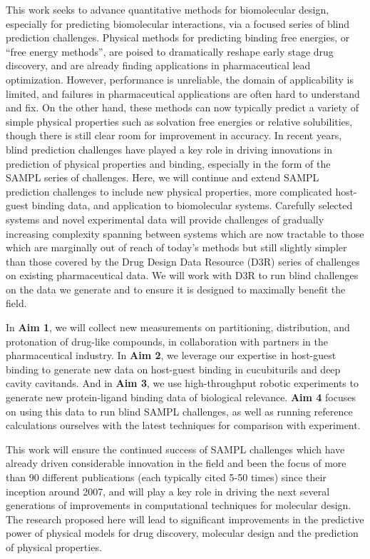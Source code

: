 \documentclass[11pt]{article}
\begin{document}
This work seeks to advance quantitative methods for biomolecular design, especially for predicting biomolecular interactions, via a focused series of blind prediction challenges. 
Physical methods for predicting binding free energies, or ``free energy methods'', are poised to dramatically reshape early stage drug discovery, and are already finding applications in pharmaceutical lead optimization. 
However, performance is unreliable, the domain of applicability is limited, and failures in pharmaceutical applications are often hard to understand and fix.
On the other hand, these methods can now typically predict a variety of simple physical properties such as solvation free energies or relative solubilities, though there is still clear room for improvement in accuracy.
In recent years, blind prediction challenges have played a key role in driving innovations in prediction of physical properties and binding, especially in the form of the SAMPL series of challenges. 
Here, we will continue and extend SAMPL prediction challenges to include new physical properties, more complicated host-guest binding data, and application to biomolecular systems.
Carefully selected systems and novel experimental data will provide challenges of gradually increasing complexity spanning between systems which are now tractable to those which are marginally out of reach of today's methods but still slightly simpler than those covered by the Drug Design Data Resource (D3R) series of challenges on existing pharmaceutical data. 
We will work with D3R to run blind challenges on the data we generate and to ensure it is designed to maximally benefit the field.

In {\bf Aim 1}, we will collect new measurements on partitioning, distribution, and protonation of drug-like compounds, in collaboration with partners in the pharmaceutical industry. In {\bf Aim 2}, we leverage our expertise in host-guest binding to generate new data on host-guest binding in cucubiturils and deep cavity cavitands. And in {\bf Aim 3}, we use high-throughput robotic experiments to generate new protein-ligand binding data of biological relevance. {\bf Aim 4} focuses on using this data to run blind SAMPL challenges, as well as running reference calculations ourselves with the latest techniques for comparison with experiment.

This work will ensure the continued success of SAMPL challenges which have already driven considerable innovation in the field and been the focus of more than 90 different publications (each typically cited 5-50 times) since their inception around 2007, and will play a key role in driving the next several generations of improvements in computational techniques for molecular design. 
The research proposed here will lead to significant improvements in the predictive power of physical models for drug discovery, molecular design and the prediction of physical properties.






%
%
%
%
\end{document}
